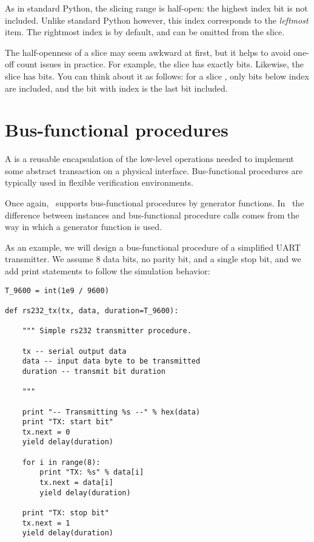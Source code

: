 As in standard Python, the slicing range is half-open: the highest
index bit is not included. Unlike standard Python however, this index
corresponds to the \emph{leftmost} item. The rightmost index is
 by default, and can be omitted from the slice.

The half-openness of a slice may seem awkward at first, but it helps
to avoid one-off count issues in practice. For example, the slice
 has exactly  bits. Likewise, the slice
 has  bits. You can think about it as
follows: for a slice \code{[i:j]}, only bits below index  are
included, and the bit with index  is the last bit included.


\section{Bus-functional procedures}

A  is a reusable encapsulation of the
low-level operations needed to implement some abstract transaction on
a physical interface. Bus-functional procedures are typically used in
flexible verification environments.

Once again, \myhdl\ supports bus-functional procedures by generator
functions. In \myhdl\, the difference between instances and
bus-functional procedure calls comes from the way in which a generator
function is used.

As an example, we will design a bus-functional procedure of a
simplified UART transmitter. We assume 8 data bits, no parity bit, and
a single stop bit, and we add print statements to follow the
simulation behavior:

\begin{verbatim}
T_9600 = int(1e9 / 9600)

def rs232_tx(tx, data, duration=T_9600):
    
    """ Simple rs232 transmitter procedure.

    tx -- serial output data
    data -- input data byte to be transmitted
    duration -- transmit bit duration
    
    """

    print "-- Transmitting %s --" % hex(data)
    print "TX: start bit"      
    tx.next = 0
    yield delay(duration)

    for i in range(8):
        print "TX: %s" % data[i]
        tx.next = data[i]
        yield delay(duration)

    print "TX: stop bit"      
    tx.next = 1
    yield delay(duration)

\end{verbatim}

